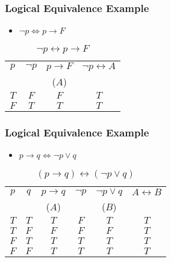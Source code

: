 \documentclass[dvipsnames]{beamer}
\begin{document}
\begin{frame}
  \frametitle{Logical Equivalence Example}

  \begin{example}
    \begin{itemize}
      \item $\neg p \Leftrightarrow p \rightarrow F$
    \end{itemize}

    \begin{table}
      \caption{$\neg p \leftrightarrow p \rightarrow F$}
      \begin{tabular}{|c|c|c||c|}\hline
        $p$ & $\neg p$ & $p \rightarrow F$ & $\neg p \leftrightarrow A$\\
            &          & ($A$)             &\\\hline\hline
        $T$ & $F$ & $F$ & $T$\\\hline
        $F$ & $T$ & $T$ & $T$\\\hline
      \end{tabular}
    \end{table}
  \end{example}
\end{frame}

\begin{frame}
  \frametitle{Logical Equivalence Example}

  \begin{example}
    \begin{itemize}
      \item $p \rightarrow q \Leftrightarrow \neg p \vee q$
    \end{itemize}

    \begin{table}
      \caption{$(p \rightarrow q) \leftrightarrow (\neg p \vee q)$}
      \begin{tabular}{|c|c|c|c|c||c|}\hline
        $p$ & $q$ & $p \rightarrow q$ & $\neg p$ & $\neg p \vee q$ & $A \leftrightarrow B$\\
            &     & ($A$)             &          & ($B$)           &\\\hline\hline
        $T$ & $T$ & $T$ & $F$ & $T$ & $T$\\\hline
        $T$ & $F$ & $F$ & $F$ & $F$ & $T$\\\hline
        $F$ & $T$ & $T$ & $T$ & $T$ & $T$\\\hline
        $F$ & $F$ & $T$ & $T$ & $T$ & $T$\\\hline
      \end{tabular}
    \end{table}
  \end{example}
\end{frame}
\end{document}
